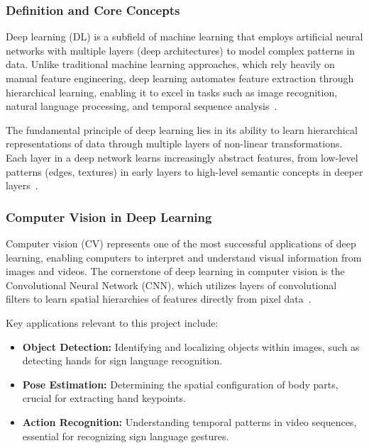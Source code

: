 \documentclass[11pt, a4paper]{article}
\begin{document}
\subsubsection{Definition and Core Concepts}

Deep learning (DL) is a subfield of machine learning that employs artificial neural networks with multiple layers (deep architectures) to model complex patterns in data. Unlike traditional machine learning approaches, which rely heavily on manual feature engineering, deep learning automates feature extraction through hierarchical learning, enabling it to excel in tasks such as image recognition, natural language processing, and temporal sequence analysis~\cite{Goodfellow16}.

The fundamental principle of deep learning lies in its ability to learn hierarchical representations of data through multiple layers of non-linear transformations. Each layer in a deep network learns increasingly abstract features, from low-level patterns (edges, textures) in early layers to high-level semantic concepts in deeper layers~\cite{LeCun15}.

\subsubsection{Computer Vision in Deep Learning}

Computer vision (CV) represents one of the most successful applications of deep learning, enabling computers to interpret and understand visual information from images and videos. The cornerstone of deep learning in computer vision is the Convolutional Neural Network (CNN), which utilizes layers of convolutional filters to learn spatial hierarchies of features directly from pixel data~\cite{Krizhevsky12}.

Key applications relevant to this project include:

\begin{itemize}
    \item \textbf{Object Detection:} Identifying and localizing objects within images, such as detecting hands for sign language recognition.
    \item \textbf{Pose Estimation:} Determining the spatial configuration of body parts, crucial for extracting hand keypoints.
    \item \textbf{Action Recognition:} Understanding temporal patterns in video sequences, essential for recognizing sign language gestures.
\end{itemize}
\end{document}
